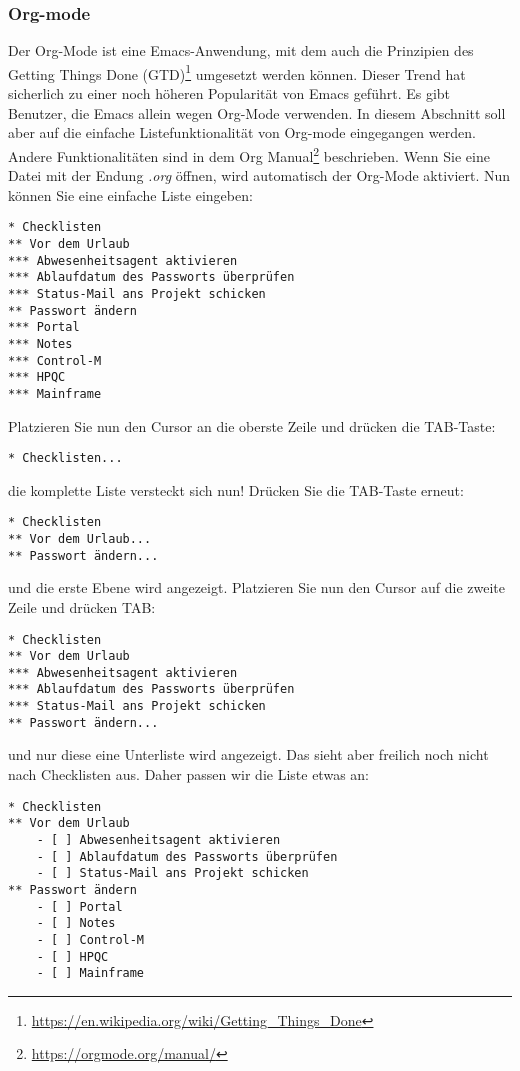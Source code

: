 \documentclass[titlepage,a4paper]{article}
\begin{document}
\subsubsection*{Org-mode}
Der Org-Mode ist eine Emacs-Anwendung, mit dem auch die
Prinzipien des Getting Things Done (GTD)\footnote{\url{https://en.wikipedia.org/wiki/Getting\_Things\_Done}}
umgesetzt werden können.  Dieser Trend hat sicherlich zu einer noch höheren Popularität von Emacs geführt.
Es gibt Benutzer, die Emacs allein wegen Org-Mode verwenden.
In diesem Abschnitt soll aber auf die einfache Listefunktionalität von Org-mode eingegangen werden.
Andere Funktionalitäten sind in dem Org Manual\footnote{\url{https://orgmode.org/manual/}} beschrieben.
Wenn Sie eine Datei mit der Endung \emph{.org} öffnen, wird automatisch der Org-Mode aktiviert.
Nun können Sie eine einfache Liste eingeben:

\begin{verbatim}
* Checklisten
** Vor dem Urlaub
*** Abwesenheitsagent aktivieren
*** Ablaufdatum des Passworts überprüfen
*** Status-Mail ans Projekt schicken
** Passwort ändern
*** Portal
*** Notes
*** Control-M
*** HPQC
*** Mainframe
\end{verbatim}

\noindent
Platzieren Sie nun den Cursor an die oberste Zeile und drücken die TAB-Taste:

\begin{verbatim}
* Checklisten...
\end{verbatim}

\noindent
die komplette Liste versteckt sich nun!  Drücken Sie die TAB-Taste erneut:

\begin{verbatim}
* Checklisten
** Vor dem Urlaub...
** Passwort ändern...
\end{verbatim}

\noindent
und die erste Ebene wird angezeigt.  Platzieren Sie nun den Cursor auf die zweite Zeile
und drücken TAB:

\begin{verbatim}
* Checklisten
** Vor dem Urlaub
*** Abwesenheitsagent aktivieren
*** Ablaufdatum des Passworts überprüfen
*** Status-Mail ans Projekt schicken
** Passwort ändern...
\end{verbatim}

\noindent
und nur diese eine Unterliste wird angezeigt.
Das sieht aber freilich noch nicht nach Checklisten aus.
Daher passen wir die Liste etwas an:

\begin{verbatim}
* Checklisten
** Vor dem Urlaub
    - [ ] Abwesenheitsagent aktivieren
    - [ ] Ablaufdatum des Passworts überprüfen
    - [ ] Status-Mail ans Projekt schicken
** Passwort ändern
    - [ ] Portal
    - [ ] Notes
    - [ ] Control-M
    - [ ] HPQC
    - [ ] Mainframe
\end{verbatim}
\end{document}
